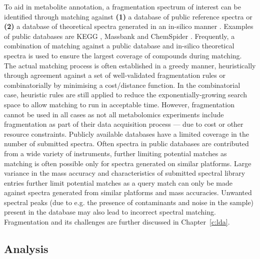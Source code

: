 To aid in metabolite annotation, a fragmentation spectrum of interest can be identified through matching against \textbf{(1)} a database of public reference spectra or \textbf{(2)} a database of theoretical spectra generated in an in-silico manner \cite{Hufsky2014}. Examples of public databases are KEGG \cite{kotera2012kegg}, Massbank \cite{horai2010massbank} and ChemSpider \cite{pence2010chemspider}. Frequently, a combination of matching against a public database and in-silico theoretical spectra is used to ensure the largest coverage of compounds during matching. The actual matching process is often established in a greedy manner, heuristically through agreement against a set of well-validated fragmentation rules or combinatorially by minimising a cost/distance function. In the combinatorial case, heuristic rules are still applied to reduce the exponentially-growing search space to allow matching to run in acceptable time. However, fragmentation cannot be used in all cases as not all metabolomics experiments include fragmentation as part of their data acquisition process --- due to cost or other resource constraints. Publicly available databases have a limited coverage in the number of submitted spectra. Often spectra in public databases are contributed from a wide variety of instruments, further limiting potential matches as matching is often possible only for spectra generated on similar platforms. Large variance in the mass accuracy and characteristics of submitted spectral library entries further limit potential matches as a query match can only be made against spectra generated from similar platforms and mass accuracies. Unwanted spectral peaks (due to e.g. the presence of contaminants and noise in the sample) present in the database may also lead to incorrect spectral matching. Fragmentation and its challenges are further discussed in Chapter~\ref{c:lda}. 

\subsection{Analysis}

